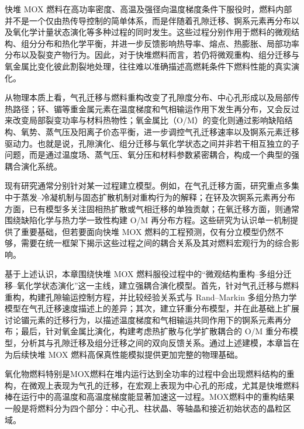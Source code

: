 

快堆 MOX 燃料在高功率密度、高温及强径向温度梯度条件下服役时，燃料内部并不是一个仅由热传导控制的简单体系，而是伴随着孔隙迁移、锕系元素再分布以及氧化学计量状态演化等多种过程的同时发生。这些过程分别作用于燃料的微观结构、组分分布和热化学平衡，并进一步反馈影响热导率、熔点、热膨胀、局部功率分布以及裂变产物行为。因此，对于快堆燃料而言，若仍将微观重构、组分迁移与氧金属比变化彼此割裂地处理，往往难以准确描述高燃耗条件下燃料性能的真实演化。

从物理本质上看，气孔迁移与燃料重构改变了孔隙度分布、中心孔形成以及局部传热路径；钚、镅等重金属元素在温度梯度和气相输运作用下发生再分布，又会反过来改变局部裂变功率与材料热物性；氧金属比（O/M）的变化则通过影响缺陷结构、氧势、蒸气压及阳离子价态平衡，进一步调控气孔迁移速率以及锕系元素迁移驱动力。也就是说，孔隙演化、组分迁移与氧化学状态之间并非若干相互独立的子问题，而是通过温度场、蒸气压、氧分压和材料参数紧密耦合，构成一个典型的强耦合演化系统。

现有研究通常分别针对某一过程建立模型。例如，在气孔迁移方面，研究重点多集中于蒸发--冷凝机制与固态扩散机制对重构行为的解释；在钚及次锕系元素再分布方面，已有模型多关注固相热扩散或气相迁移的单独贡献；在氧迁移方面，则通常围绕缺陷化学与热力学一致性构建 O/M 再分布方程。这些研究为认识单一机制提供了重要基础，但若要面向快堆 MOX 燃料的工程预测，仅有分立模型仍然不够，需要在统一框架下揭示这些过程之间的耦合关系及其对燃料宏观行为的综合影响。

基于上述认识，本章围绕快堆 MOX 燃料服役过程中的“微观结构重构--多组分迁移--氧化学状态演化”这一主线，建立强耦合演化模型。首先，针对气孔迁移与燃料重构，构建孔隙输运控制方程，并比较经验关系式与 Rand--Markin 多组分热力学模型在气孔迁移速度描述上的差异；其次，建立钚重分布模型，并在此基础上扩展讨论镅元素的迁移行为，以描述温度梯度和气相输运共同作用下的锕系元素再分布；最后，针对氧金属比演化，构建考虑热扩散与化学扩散耦合的 O/M 重分布模型，分析其与孔隙迁移及组分迁移之间的双向反馈关系。通过上述建模，本章旨在为后续快堆 MOX 燃料高保真性能模拟提供更加完整的物理基础。

\label{sec:pore_migration}

氧化物燃料特别是MOX燃料在堆内运行达到全功率的过程中会出现燃料结构的重构，在微观上表现为气孔的迁移，在宏观上表现为中心孔的形成，尤其是快堆燃料棒在运行中的高温度和高温度梯度能显著加速这一过程。MOX燃料中的重构结果一般是将燃料分为四个部分：中心孔、柱状晶、等轴晶和接近初始状态的晶粒区域。

